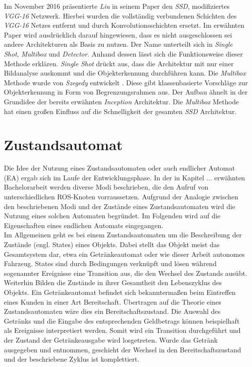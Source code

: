 		Im November 2016 präsentierte \textit{Liu} in seinem Paper den \textit{SSD}, modifiziertes \textit{VGG-16} Netzwerk. Hierbei wurden die vollständig verbundenen Schichten des \textit{VGG-16} Netzes entfernt und durch Konvolutionsschichten ersetzt. Im erwähnten Paper wird ausdrücklich darauf hingewiesen, dass es nicht ausgeschlossen sei andere Architekturen als Basis zu nutzen. Der Name unterteilt sich in \textit{Single Shot}, \textit{Multibox} und \textit{Detector}. Anhand dessen lässt sich die Funktionsweise dieser Methode erklären. \textit{Single Shot} drückt aus, dass die Architektur mit nur einer Bildanalyse auskommt und die Objekterkennung durchführen kann. Die \textit{Multibox} Methode wurde von \textit{Szegedy} entwickelt \cite{multibox}. Diese gibt klassenbasierte Vorschläge zur Objekterkennung in Form von Begrenzungsrahmen aus. Der Aufbau ähnelt in der Grundidee der bereits erwähnten \textit{Inception} Architektur. Die \textit{Multibox} Methode hat einen großen Einfluss auf die Schnelligkeit der gesamten \textit{SSD} Architektur. 
		
		
		
		
		  			
	

			
	\section{Zustandsautomat}
	\label{sec: Zustandautomat}
	Die Idee der Nutzung eines Zustandsautomaten oder auch endlicher Automat (EA) ergab sich im Laufe der Entwicklungsphase. In der in Kapitel ... erwähnten Bachelorarbeit werden diverse Modi beschrieben, die den Aufruf von unterschiedlichen ROS-Knoten vorraussetzen. Aufgrund der Analogie zwischen den beschriebenen Modi und der Zustände eines Zustandsautomaten wird die Nutzung eines solchen Automaten begründet. Im Folgenden wird auf die Eigenschaften eines endlichen Automats eingegangen.\\
	
	Im Allgemeinen geht es bei einem Zustandsautomaten um die Beschreibung der Zustände (engl. States) eines Objekts. Dabei stellt das Objekt meist das Gesamtsystem dar, etwa ein Getränkeautomat oder wie dieser Arbeit autonomes Fahrzeug. States sind durch Bedingungen verknüpft und lösen während sogenannter Ereignisse eine Transition aus, die den Wechsel des Zustands ausübt. Weiterhin Bilden die Zustände in ihrer Gesamtheit den Lebenszyklus des Objekts. Ein Getränkeautomat befindet sich bekanntermaßen beim Eintreffen eines Kunden in einer Art Bereitschaft. Übertragen auf die Theorie eines Zustandsautomaten wäre dies ein Bereitschaftszustand. Die Auswahl des Getränks und die Eingabe des entsprechenden Geldbetrags können beispielhaft als Ereignisse interpretiert werden. Somit wird ein Transition durchgeführt und der Zustand der Getränkeausgabe wird losgetreten. Wurde das Getränk ausgegeben und entnommen, geschieht der Wechsel in den Bereitschaftszustand und der beschriebene Zyklus ist komplettiert.\\
	

